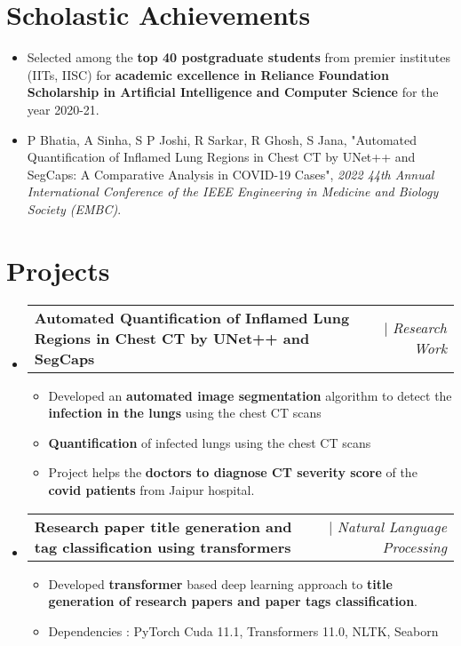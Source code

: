 \documentclass[letterpaper,11pt]{article}
\makeatletter
\newcommand{\resumeItem}[1]{
  \item\small{
    {#1 \vspace{-2pt}}
  }
}
\newcommand{\resumeProjectHeading}[2]{
    \item
    \begin{tabular*}{0.97\textwidth}{l@{\extracolsep{\fill}}r}
      \small#1 & #2 \\
    \end{tabular*}\vspace{-7pt}
}
\newcommand{\resumeSubHeadingListStart}{\begin{itemize}[leftmargin=0.15in, label={}]}
\newcommand{\resumeSubHeadingListEnd}{\end{itemize}}
\newcommand{\resumeItemListStart}{\begin{itemize}}
\newcommand{\resumeItemListEnd}{\end{itemize}\vspace{-5pt}}
\makeatother
\begin{document}
\section{Scholastic Achievements}
\begin{itemize}
    \resumeItem{Selected among the \textbf{top 40 postgraduate students} from premier institutes (IITs, IISC) for \textbf{academic excellence in Reliance Foundation Scholarship in Artificial Intelligence and Computer Science} for the year 2020-21.}
    \item P Bhatia, A Sinha, S P Joshi, R Sarkar, R Ghosh, S Jana, "Automated Quantification of Inflamed Lung Regions in Chest CT by UNet++ and SegCaps: A Comparative Analysis in COVID-19 Cases", {\it2022 44th Annual International Conference of the IEEE Engineering in Medicine and Biology Society (EMBC)}.
\end{itemize}


\section{Projects}
    \resumeSubHeadingListStart
      \resumeProjectHeading
          {\textbf{Automated Quantification of Inflamed Lung Regions in Chest CT by UNet++ and SegCaps}}
          {{ $|$ \emph{Research Work}}}
          \resumeItemListStart
            \resumeItem{Developed an \textbf{automated image segmentation} algorithm to detect the \textbf{infection in the lungs} using the chest CT scans}
            \resumeItem{\textbf{Quantification} of infected lungs using the chest CT scans}
            \resumeItem{Project helps the \textbf{doctors to diagnose CT severity score} of the \textbf{covid patients} from Jaipur hospital.}
          \resumeItemListEnd
      \resumeProjectHeading
          {\textbf{Research paper title generation and tag classification using transformers}}
          {{ $|$ \emph{Natural Language Processing}}}
          \resumeItemListStart
            \resumeItem{Developed \textbf{transformer} based deep learning approach to \textbf{title generation of research papers and paper tags classification}.}
            \resumeItem{Dependencies : PyTorch Cuda 11.1, Transformers 11.0, NLTK, Seaborn}
          \resumeItemListEnd
    \resumeSubHeadingListEnd

\begin{comment}
    {\emph{Research Work} $|$ {Jan 2021 - July 2022}}
    {\emph{Natural Language Processing} $|$ {Feb 2021 - May 2021}}
\end{comment}

\end{document}
